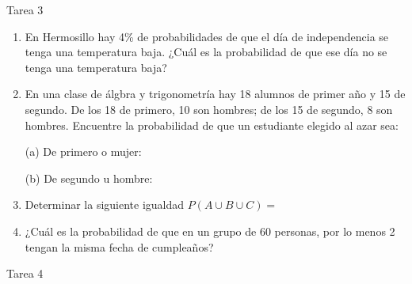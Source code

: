 \documentclass[a4paper, 12pt]{article}
\newcommand{\Pspace}{0.5cm}
\newcommand{\Aspace}{0.2cm}
\begin{document}
\newpage
\begin{center}
    { \LARGE Tarea 3}
\end{center}

\begin{enumerate}
    \item En Hermosillo hay 4\% de probabilidades de que el día de independencia se tenga una temperatura baja. ¿Cuál es la probabilidad de que ese día no se tenga una temperatura baja?
    \vspace{\Aspace} \par
    { \color{azul}  }


    \vspace{\Pspace}
    \item En una clase de álgbra y trigonometría hay 18 alumnos de primer año y 15 de segundo. De los 18 de primero, 10 son hombres; de los 15 de segundo, 8 son hombres. Encuentre la probabilidad de que un estudiante elegido al azar sea:
    \vspace{\Aspace} \par
    (a) De primero o mujer:
    \\ { \color{azul}  }

    \vspace{\Aspace}
    (b) De segundo u hombre:
    \\ { \color{azul}  }


    \vspace{\Pspace}
    \item Determinar la siguiente igualdad $P(A \cup B \cup C) =$
    \vspace{\Aspace} \par
    { \color{azul}  }


    \vspace{\Pspace}
    \item ¿Cuál es la probabilidad de que en un grupo de 60 personas, por lo menos 2 tengan la misma fecha de cumpleaños?
    \vspace{\Aspace} \par
    { \color{azul}  } 
\end{enumerate}



\newpage
\begin{center}
    { \LARGE Tarea 4}
\end{center}
\end{document}
